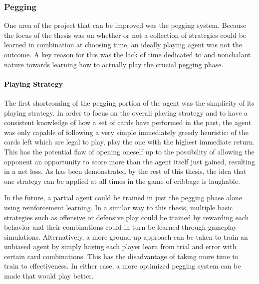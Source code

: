 
\subsubsection*{Pegging}
\label{sec:disc-future-pegging}



One area of the project that can be improved was the pegging system.
%
Because the focus of the thesis was on whether or not a collection of
strategies could be learned in combination at choosing time,
an ideally playing agent was not the outcome.
%
A key reason for this was the lack of time dedicated to and nonchalant nature
towards learning how to actually play the crucial pegging phase.

\paragraph*{Playing Strategy}


The first shortcoming of the pegging portion of the agent was the simplicity
of its playing strategy.
%
In order to focus on the overall playing strategy and to have a consistent
knowledge of how a set of cards have performed in the past,
the agent was only capable of following a very simple immediately greedy 
heuristic:
of the cards left which are legal to play,
play the one with the highest immediate return.
%
This has the potential flaw of
opening oneself up to the possibility of allowing the opponent an opportunity
to score more than the agent itself just gained,
resulting in a net loss.
%
As has been demonstrated by the rest of this thesis,
the idea that one strategy can be applied at all times in the game of cribbage
is laughable.

In the future,
a partial agent could be trained in just the pegging phase alone
using reinforcement learning.
%
In a similar way to this thesis,
multiple basic strategies such as offensive or defensive play
could be trained by rewarding each behavior and their combinations
could in turn be learned through gameplay simulations.
%
Alternatively,
a more ground-up approach can be taken to train an unbiased agent by simply
having each player learn from trial and error with certain card combinations.
%
This has the disadvantage of taking more time to train to effectiveness.
%
In either case,
a more optimized pegging system can be made that would play better.


